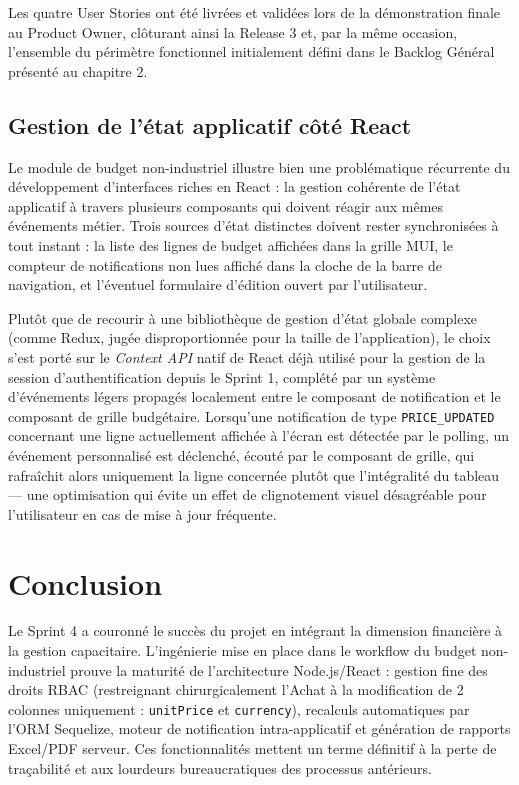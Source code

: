 Les quatre User Stories ont été livrées et validées lors de la démonstration finale au Product Owner, clôturant ainsi la Release 3 et, par la même occasion, l'ensemble du périmètre fonctionnel initialement défini dans le Backlog Général présenté au chapitre 2.

\subsection{Gestion de l'état applicatif côté React}
Le module de budget non-industriel illustre bien une problématique récurrente du développement d'interfaces riches en React : la gestion cohérente de l'état applicatif à travers plusieurs composants qui doivent réagir aux mêmes événements métier. Trois sources d'état distinctes doivent rester synchronisées à tout instant : la liste des lignes de budget affichées dans la grille MUI, le compteur de notifications non lues affiché dans la cloche de la barre de navigation, et l'éventuel formulaire d'édition ouvert par l'utilisateur.

Plutôt que de recourir à une bibliothèque de gestion d'état globale complexe (comme Redux, jugée disproportionnée pour la taille de l'application), le choix s'est porté sur le \textit{Context API} natif de React déjà utilisé pour la gestion de la session d'authentification depuis le Sprint 1, complété par un système d'événements légers propagés localement entre le composant de notification et le composant de grille budgétaire. Lorsqu'une notification de type \texttt{PRICE\_UPDATED} concernant une ligne actuellement affichée à l'écran est détectée par le polling, un événement personnalisé est déclenché, écouté par le composant de grille, qui rafraîchit alors uniquement la ligne concernée plutôt que l'intégralité du tableau — une optimisation qui évite un effet de clignotement visuel désagréable pour l'utilisateur en cas de mise à jour fréquente.

\section{Conclusion}
Le Sprint 4 a couronné le succès du projet en intégrant la dimension financière à la gestion capacitaire. L'ingénierie mise en place dans le workflow du budget non-industriel prouve la maturité de l'architecture Node.js/React : gestion fine des droits RBAC (restreignant chirurgicalement l'Achat à la modification de 2 colonnes uniquement : \texttt{unitPrice} et \texttt{currency}), recalculs automatiques par l'ORM Sequelize, moteur de notification intra-applicatif et génération de rapports Excel/PDF serveur. Ces fonctionnalités mettent un terme définitif à la perte de traçabilité et aux lourdeurs bureaucratiques des processus antérieurs.

